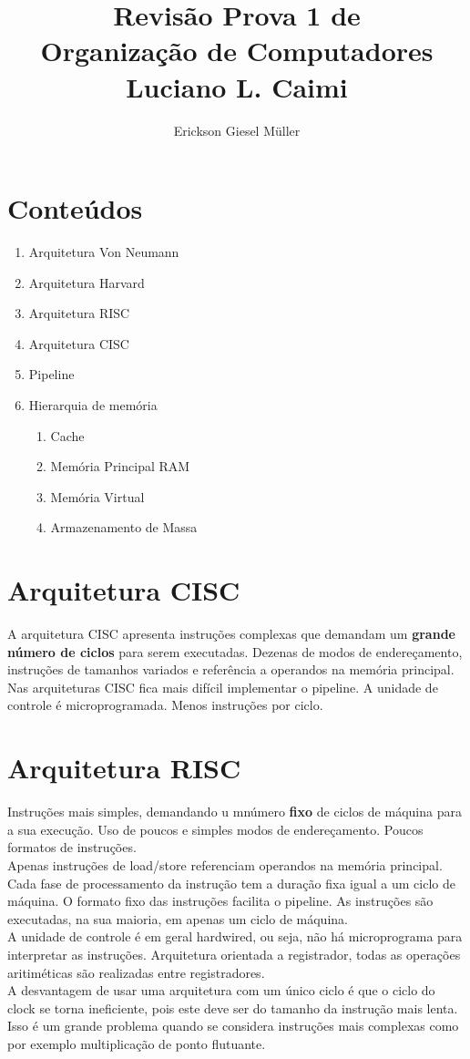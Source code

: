 \documentclass{article}
\title{Revisão Prova 1 de\\Organização de Computadores\\Luciano L. Caimi}
\author{Erickson Giesel Müller}
\date{}
\begin{document}
	\maketitle
	\section*{Conteúdos}
		\begin{enumerate}
			\item Arquitetura Von Neumann
			\item Arquitetura Harvard
			\item Arquitetura RISC
			\item Arquitetura CISC
			
			\item Pipeline
			\item Hierarquia de memória
				\begin{enumerate}
				 	\item Cache
				 	\item Memória Principal RAM
				 	\item Memória Virtual
				 	\item Armazenamento de Massa
				\end{enumerate}
		\end{enumerate}
	\section{Arquitetura CISC}
		A arquitetura CISC apresenta instruções complexas que demandam um \textbf	{grande número de ciclos} para serem executadas. Dezenas de modos de endereçamento, instruções de tamanhos variados e referência a operandos na memória principal.\\
		Nas arquiteturas CISC fica mais difícil implementar o pipeline. A unidade de controle é microprogramada. Menos instruções por ciclo.
		
	\section{Arquitetura RISC}
		Instruções mais simples, demandando u mnúmero \textbf{fixo} de ciclos de máquina para a sua execução. Uso de poucos e simples modos de endereçamento. Poucos formatos de instruções.\\
		Apenas instruções de load/store referenciam operandos na memória principal. Cada fase de processamento da instrução tem a duração fixa igual a um ciclo de máquina. O formato fixo das instruções facilita o pipeline. As instruções são executadas, na sua maioria, em apenas um ciclo de máquina.\\
		A unidade de controle é em geral hardwired, ou seja, não há microprograma para interpretar as instruções. Arquitetura orientada a registrador, todas as operações aritiméticas são realizadas entre registradores.\\
		A desvantagem de usar uma arquitetura com um único ciclo é que o ciclo do clock se torna ineficiente, pois este deve ser do tamanho da instrução mais lenta. Isso é um grande problema quando se considera instruções mais complexas como por exemplo multiplicação de ponto flutuante.
	
\end{document}
